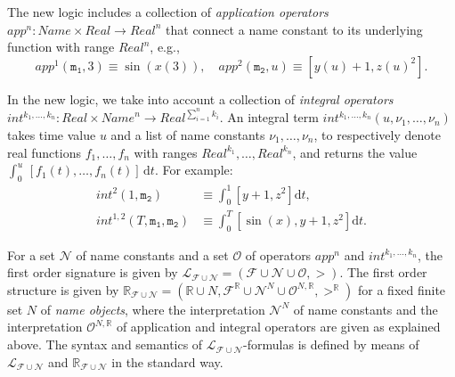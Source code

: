 The new logic 
includes
a collection of \emph{application operators} $\mathit{app}^n : \mathit{Name} \times \mathit{Real} \to \mathit{Real}^n$
that connect a name constant to its underlying function with range $\mathit{Real}^n$, e.g.,
\[
\mathit{app}^1(\mathtt{m_1}, 3) \equiv \sin(x(3)),
\quad
\mathit{app}^2(\mathtt{m_2}, u) \equiv [y(u) + 1,z(u)^2].
\]
 

In the new logic,  we take into account
a collection of \emph{integral operators} 
$\mathit{int}^{k_1,\ldots,k_n} :  \mathit{Real} \times \mathit{Name}^n  \to \mathit{Real}^{\sum_{i=1}^n k_i}$.
An integral term
$\mathit{int}^{k_1,\ldots,k_n}(u,\nu_1,\ldots,\nu_n)$
takes time value $u$
and a list of name constants $\nu_1,\ldots,\nu_n$,
to respectively denote real functions $f_1,\ldots,f_n$ with ranges $\mathit{Real}^{k_1},\ldots,\mathit{Real}^{k_n}$,
and returns the value $\int_0^u \, [f_1(t),\ldots,f_n(t)] \,\mathrm{d}t$.  
For example:
\begin{align*}
\mathit{int}^{2}(1, \mathtt{m_2}) 
&\equiv
\textstyle\int_0^1
[y + 1, z^2]
\mathrm{d}t,
\\
\mathit{int}^{1,2}(T,\mathtt{m_1},\mathtt{m_2}) 
&\equiv
\textstyle\int_0^T
[\sin(x),y + 1,z^2]
\mathrm{d}t.
\end{align*}









\begin{definition}
For a  set $\mathcal{N}$ of name constants
and a set  $\mathcal{O}$ of operators  $\mathit{app}^n$ and  $\mathit{int}^{k_1,\ldots,k_n}$,
the first order signature is given by 
$\mathcal{L}_{\mathcal{F}\cup\mathcal{N}} = (\mathcal{F} \cup \mathcal{N} \cup \mathcal{O}, >)$.
%
The first order structure is given by
$\mathbb{R}_{\mathcal{F}\cup\mathcal{N}} 
= (\mathbb{R} \cup N, \mathcal{F}^\mathbb{R} \cup \mathcal{N}^N \cup \mathcal{O}^{N,\mathbb{R}}, >^\mathbb{R})$
for a fixed finite set $N$ of \emph{name objects},
where the interpretation $\mathcal{N}^N$ of name constants and 
the interpretation $\mathcal{O}^{N,\mathbb{R}}$ of application and integral operators 
are given as explained above.
%
The syntax and semantics of $\mathcal{L}_{\mathcal{F}\cup\mathcal{N}}$-formulas 
is defined by means of $\mathcal{L}_{\mathcal{F}\cup\mathcal{N}}$ and $\mathbb{R}_{\mathcal{F}\cup\mathcal{N}}$
in the standard way.
\end{definition}




